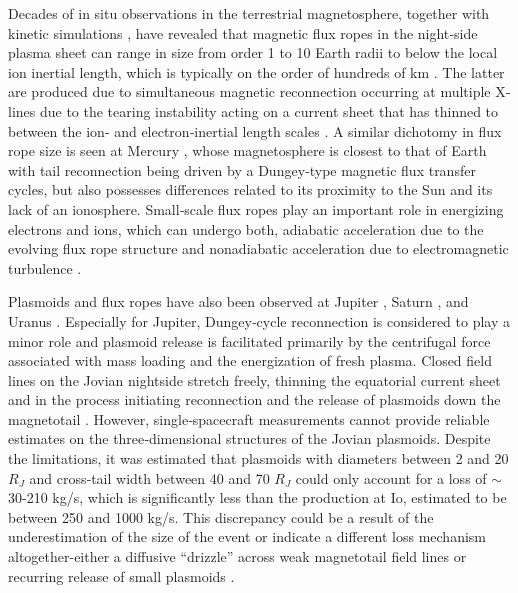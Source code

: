 Decades of in situ observations in the terrestrial magnetosphere, together with kinetic simulations \cite{Drake2006ElectronReconnection, Drake2006FormationReconnection}, have revealed that magnetic flux ropes in the night‐side plasma sheet can range in size from order 1 to 10 Earth radii \cite{Ieda1998StatisticalObservations,Slavin1995ISEETopologies} to below the local ion inertial length, which is typically on the order of hundreds of km \cite{Eastwood2016Ion-scaleMMS,Sun2019MMSSheet}. The latter are produced due to simultaneous magnetic reconnection occurring at multiple X‐lines due to the tearing instability acting on a current sheet that has thinned to between the ion‐ and electron‐inertial length scales \cite{Daughton2011RolePlasmas,Drake2006ElectronReconnection,Lapenta2015SecondaryFronts}. A similar dichotomy in flux rope size is seen at Mercury \cite{DiBraccio2015MESSENGERMagnetotail,Slavin2009MESSENGERMagnetosphere,Zhong2019Magnetotail}, whose magnetosphere is closest to that of Earth with tail reconnection being driven by a Dungey‐type \cite{Dungey1961b} magnetic flux transfer cycles, but also possesses differences related to its proximity to the Sun and its lack of an ionosphere. Small‐scale flux ropes play an important role in energizing electrons and ions, which can undergo both, adiabatic acceleration due to the evolving flux rope structure \cite{Drake2006FormationReconnection,Le2012ElectronCoalescence,Zhong2019Magnetotail} and nonadiabatic acceleration due to electromagnetic turbulence \cite{Kronberg2019AccelerationRole}.

Plasmoids and flux ropes have also been observed at Jupiter \cite{Kronberg2007AMagnetosphere,Kronberg2008MassParameters,Russell2000SubstormsTail,Vogt2010a,Vogt2014,Woch2002a}, Saturn \cite{Jackman2011CassiniSaturn}, and Uranus \cite{DiBraccio2019VoyagerUranus}. Especially for Jupiter, Dungey‐cycle reconnection is considered to play a minor role \cite{Cowley2008,McComas2007a} and plasmoid release is facilitated primarily by the centrifugal force associated with mass loading and the energization of fresh plasma. Closed field lines on the Jovian nightside stretch freely, thinning the equatorial current sheet and in the process initiating reconnection and the release of plasmoids down the magnetotail \cite{Cowley2015Down-tailMagnetospheres,Kivelson2005DynamicalMagnetosphere,Vasyliunas1983a}. However, single‐spacecraft measurements cannot provide reliable estimates on the three‐dimensional structures of the Jovian plasmoids. Despite the limitations, it was estimated that plasmoids with diameters between 2 and 20 $R_J$ and cross‐tail width between 40 and 70 $R_J$ \cite{Vogt2014} could only account for a loss of $\sim$30-210 kg/s, which is significantly less than the production at Io, estimated to be between 250 and 1000 kg/s. This discrepancy could be a result of the underestimation of the size of the event \cite{Cowley2015Down-tailMagnetospheres} or indicate a different loss mechanism altogether-either a diffusive ``drizzle'' across weak magnetotail field lines or recurring release of small plasmoids \cite{Bagenal2007ThePoles,Kivelson2005DynamicalMagnetosphere}.

